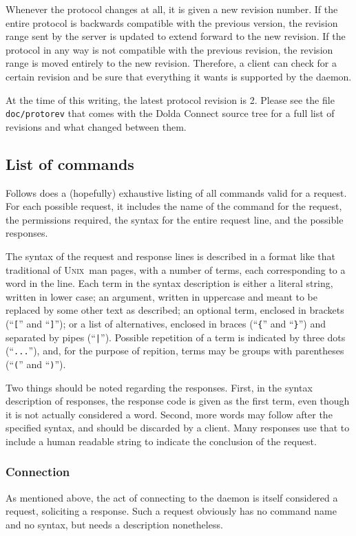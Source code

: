 \documentclass[twoside,a4paper,11pt]{article}
\newcommand{\unix}{\textsc{Unix}}
\begin{document}
Whenever the protocol changes at all, it is given a new revision
number. If the entire protocol is backwards compatible with the
previous version, the revision range sent by the server is updated to
extend forward to the new revision. If the protocol in any way is not
compatible with the previous revision, the revision range is moved
entirely to the new revision. Therefore, a client can check for a
certain revision and be sure that everything it wants is supported by
the daemon.

At the time of this writing, the latest protocol revision is 2. Please
see the file \texttt{doc/protorev} that comes with the Dolda Connect
source tree for a full list of revisions and what changed between
them.

\subsection{List of commands}

Follows does a (hopefully) exhaustive listing of all commands valid
for a request. For each possible request, it includes the name of the
command for the request, the permissions required, the syntax for the
entire request line, and the possible responses.

The syntax of the request and response lines is described in a format
like that traditional of \unix\ man pages, with a number of terms,
each corresponding to a word in the line. Each term in the syntax
description is either a literal string, written in lower case; an
argument, written in uppercase and meant to be replaced by some other
text as described; an optional term, enclosed in brackets
(``\texttt{[}'' and ``\texttt{]}''); or a list of alternatives,
enclosed in braces (``\texttt{\{}'' and ``\texttt{\}}'') and separated
by pipes (``\texttt{|}''). Possible repetition of a term is indicated
by three dots (``\texttt{...}''), and, for the purpose of repition,
terms may be groups with parentheses (``\texttt{(}'' and
``\texttt{)}'').

Two things should be noted regarding the responses. First, in the
syntax description of responses, the response code is given as the
first term, even though it is not actually considered a word. Second,
more words may follow after the specified syntax, and should be
discarded by a client. Many responses use that to include a human
readable string to indicate the conclusion of the request.

\subsubsection{Connection}
As mentioned above, the act of connecting to the daemon is itself
considered a request, soliciting a response. Such a request obviously
has no command name and no syntax, but needs a description
nonetheless.
\end{document}
